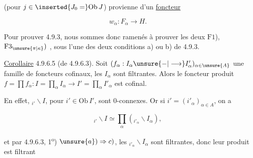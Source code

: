 

(pour $j\in\inserted{J_0=}\mathrm{Ob}\,J$) provienne d'un \uline{foncteur}

\[w_\alpha:F_\alpha\longrightarrow H.\]

 Pour prouver 4.9.3, nous sommes donc ramenés à prouver les deux  $\mathrm{F}1$), $\mathrm{F}3_{\unsure{\pi|\kappa}})$ , sous l'une des deux conditions a) ou b) de 4.9.3.


\uline{Corollaire} 4.9.6.5 (de 4.9.6.3). Soit $(f_\alpha:I_\alpha\unsure{\mathbin{-}|\longrightarrow} I'_\alpha)_{\alpha\in\unsure{A}}$ une famille de foncteurs cofinaux, les $I_\alpha$ sont  filtrantes. Alors le foncteur produit $f=\prod f_\alpha:I=\prod_\alpha I_\alpha\longrightarrow I'=\prod_\alpha I'_\alpha$ est cofinal.

En effet,    $ {}_{i'}\backslash I$, pour $i'\in\mathrm{Ob}\,I'$, sont $0$-connexes. Or si $i'=(i'_\alpha)_{\alpha\in A}$, on a

\[ {}_{i'}\backslash I\simeq\prod_\alpha({}_{i'_\alpha}\backslash I_\alpha),\]

et par 4.9.6.3, 1\textsuperscript{o}) $\unsure{a})\Rightarrow c)$, les $ {}_{i'_\alpha}\backslash I_\alpha$ sont filtrantes, donc leur produit est filtrant

